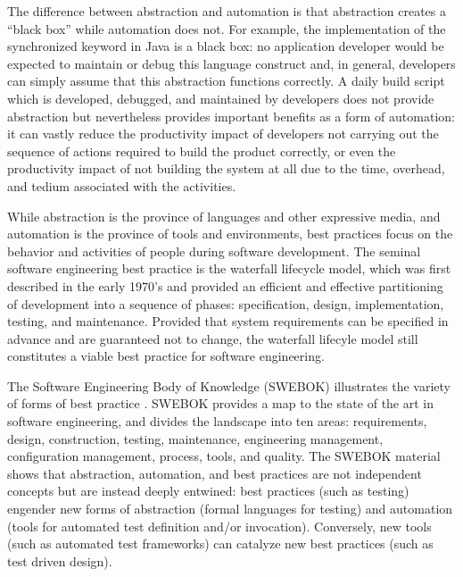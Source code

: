 The difference between abstraction and automation is that abstraction
creates a ``black box'' while automation does not. For example, the
implementation of the synchronized keyword in Java is a black box: no
application developer would be expected to maintain or debug this language
construct and, in general, developers can simply assume that this
abstraction functions correctly.  A daily build script which is developed,
debugged, and maintained by developers does not provide abstraction but
nevertheless provides important benefits as a form of automation: it can
vastly reduce the productivity impact of developers not carrying out the
sequence of actions required to build the product correctly, or even the
productivity impact of not building the system at all due to the time,
overhead, and tedium associated with the activities.

While abstraction is the province of languages and other expressive media,
and automation is the province of tools and environments, best practices
focus on the behavior and activities of people during software development.
The seminal software engineering best practice is the waterfall lifecycle
model, which was first described in the early 1970's and provided an
efficient and effective partitioning of development into a sequence of
phases: specification, design, implementation, testing, and maintenance.
Provided that system requirements can be specified in advance and are
guaranteed not to change, the waterfall lifecyle model still constitutes a
viable best practice for software engineering.

The Software Engineering Body of Knowledge (SWEBOK) illustrates the variety
of forms of best practice \cite{Abran05}.  SWEBOK provides a map to the
state of the art in software engineering, and divides the landscape into
ten areas: requirements, design, construction, testing, maintenance,
engineering management, configuration management, process, tools, and
quality.  The SWEBOK material shows that abstraction, automation, and best
practices are not independent concepts but are instead deeply entwined:
best practices (such as testing) engender new forms of abstraction (formal
languages for testing) and automation (tools for automated test definition
and/or invocation). Conversely, new tools (such as automated test
frameworks) can catalyze new best practices (such as test driven design).

